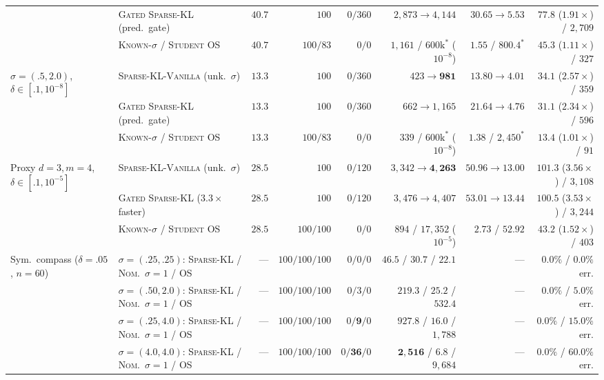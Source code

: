 \documentclass{article}
\theoremstyle{plain}
\theoremstyle{definition}
\begin{document}
\begin{table}[!htbp]
{\begin{tabular}{@{}llrrrrrr@{}}
 & \textsc{Gated Sparse-KL} (pred.\ gate) & $40.7$ & $100$ & $0/360$ & $2{,}873\to 4{,}144$ & $30.65\to 5.53$ & $\mathbf{77.8}$ ($\mathbf{1.91\times}$) / $2{,}709$ \\
 & \textsc{Known-$\sigma$} / \textsc{Student OS} & $40.7$ & $100/83$ & $0/0$ & $1{,}161$ / $600\mathrm{k}^*$ ($10^{-8}$) & $1.55$ / $800.4^*$ & $45.3$ ($1.11\times$) / $327$ \\
\midrule
\multirow{3}{*}{$\sigma=(.5,2.0)$, $\delta\in[.1,10^{-8}]$}
 & \textsc{Sparse-KL-Vanilla} (unk.\ $\sigma$) & $13.3$ & $100$ & $0/360$ & $423\to \mathbf{981}$ & $13.80\to \mathbf{4.01}$ & $34.1$ ($2.57\times$) / $359$ \\
 & \textsc{Gated Sparse-KL} (pred.\ gate) & $13.3$ & $100$ & $0/360$ & $662\to 1{,}165$ & $21.64\to 4.76$ & $\mathbf{31.1}$ ($\mathbf{2.34\times}$) / $596$ \\
 & \textsc{Known-$\sigma$} / \textsc{Student OS} & $13.3$ & $100/83$ & $0/0$ & $339$ / $600\mathrm{k}^*$ ($10^{-8}$) & $1.38$ / $2{,}450^*$ & $13.4$ ($1.01\times$) / $91$ \\
\midrule
\multirow{3}{*}{Proxy $d=3,m=4$, $\delta\in[.1,10^{-5}]$}
 & \textsc{Sparse-KL-Vanilla} (unk.\ $\sigma$) & $28.5$ & $100$ & $0/120$ & $3{,}342\to \mathbf{4{,}263}$ & $50.96\to \mathbf{13.00}$ & $101.3$ ($3.56\times$) / $3{,}108$ \\
 & \textsc{Gated Sparse-KL} ($3.3\times$ faster) & $28.5$ & $100$ & $0/120$ & $3{,}476\to 4{,}407$ & $53.01\to 13.44$ & $100.5$ ($3.53\times$) / $3{,}244$ \\
 & \textsc{Known-$\sigma$} / \textsc{Student OS} & $28.5$ & $100/100$ & $0/0$ & $894$ / $17{,}352$ ($10^{-5}$) & $2.73$ / $52.92$ & $43.2$ ($1.52\times$) / $403$ \\
\midrule
\multirow{4}{*}{Sym.\ compass ($\delta=.05$, $n=60$)}
 & $\sigma=(.25,.25)$: \textsc{Sparse-KL} / \textsc{Nom.\ $\sigma{=}1$} / \textsc{OS} & --- & $100/100/100$ & $0/0/0$ & $46.5$ / $30.7$ / $22.1$ & --- & $0.0\%$ / $0.0\%$ err. \\
 & $\sigma=(.50,2.0)$: \textsc{Sparse-KL} / \textsc{Nom.\ $\sigma{=}1$} / \textsc{OS} & --- & $100/100/100$ & $0/3/0$ & $\mathbf{219.3}$ / $25.2$ / $532.4$ & --- & $\mathbf{0.0\%}$ / $5.0\%$ err. \\
 & $\sigma=(.25,4.0)$: \textsc{Sparse-KL} / \textsc{Nom.\ $\sigma{=}1$} / \textsc{OS} & --- & $100/100/100$ & $0/\mathbf{9}/0$ & $\mathbf{927.8}$ / $16.0$ / $1{,}788$ & --- & $\mathbf{0.0\%}$ / $\mathbf{15.0\%}$ err. \\
 & $\sigma=(4.0,4.0)$: \textsc{Sparse-KL} / \textsc{Nom.\ $\sigma{=}1$} / \textsc{OS} & --- & $100/100/100$ & $0/\mathbf{36}/0$ & $\mathbf{2{,}516}$ / $6.8$ / $9{,}684$ & --- & $\mathbf{0.0\%}$ / $\mathbf{60.0\%}$ err. \\
\bottomrule
\end{tabular}%
}
\end{table}
\end{document}
